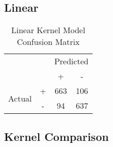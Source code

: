 \subsection{Linear}



\begin{table}[h!]
    \centering
    \begin{tabular}[h]{c c|c|c|}
        \cline{3-4}
        & & \multicolumn{2}{c|}{Predicted} \\
        \cline{3-4}
        & & + & - \\
        \hline
        \multicolumn{1}{|c|}{\multirow{2}{3em}{Actual}} & + & 663 & 106 \\
        \cline{2-4}
        \multicolumn{1}{|c|}{} & - & 94 & 637 \\
        \hline
    \end{tabular}
    \caption{\label{tab:lin_confusion}Linear Kernel Model Confusion Matrix}
\end{table}

\subsection{Kernel Comparison}


